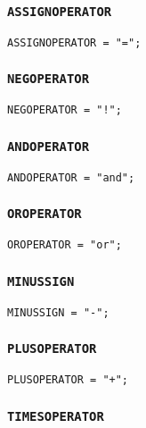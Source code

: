 \documentclass[12pt, a4paper]{article}
\begin{document}
\subsubsection{\texttt{ASSIGNOPERATOR}}

\begin{verbatim}
ASSIGNOPERATOR = "=";
\end{verbatim}

\subsubsection{\texttt{NEGOPERATOR}}

\begin{verbatim}
NEGOPERATOR = "!";
\end{verbatim}

\subsubsection{\texttt{ANDOPERATOR}}

\begin{verbatim}
ANDOPERATOR = "and";
\end{verbatim}

\subsubsection{\texttt{OROPERATOR}}

\begin{verbatim}
OROPERATOR = "or";
\end{verbatim}

\subsubsection{\texttt{MINUSSIGN}}

\begin{verbatim}
MINUSSIGN = "-";
\end{verbatim}

\subsubsection{\texttt{PLUSOPERATOR}}

\begin{verbatim}
PLUSOPERATOR = "+";
\end{verbatim}

\subsubsection{\texttt{TIMESOPERATOR}}
\end{document}
